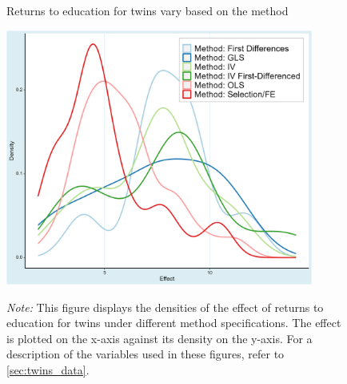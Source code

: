 \clearpage
\begin{figure}[!htbp]
  \begin{center}
    \caption{Returns to education for twins vary based on the method}
    \label{fig:twins_prima_facie}
    \includegraphics[width=0.9\textwidth]{Figures/twins_prima_method.png}
  \end{center}\vspace{-0.7cm}
  \captionsetup{width=0.9\textwidth, font = scriptsize}
  \caption*{\emph{Note:} This figure displays the densities of the effect of returns to education for twins under different method specifications. The effect is plotted on the x-axis against its density on the y-axis. For a description of the variables used in these figures, refer to \autoref{sec:twins_data}.}
\end{figure}












